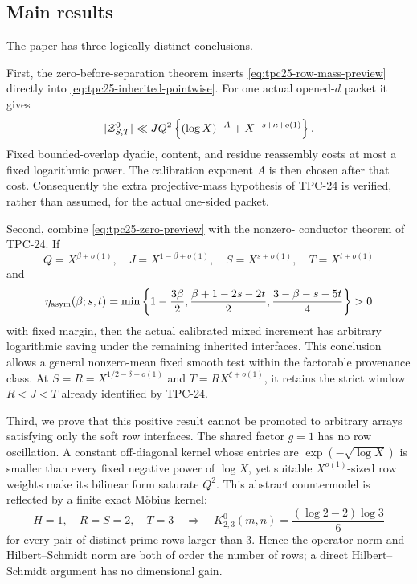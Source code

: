 \subsection{Main results}

The paper has three logically distinct conclusions.

First, the zero-before-separation theorem inserts
\eqref{eq:tpc25-row-mass-preview} directly into
\eqref{eq:tpc25-inherited-pointwise}.  For one actual opened-\(d\)
packet it gives
\begin{equation}
 |\mathcal Z^0_{S,T}|
 \ll JQ^2\left\{(\log X)^{-A}
       +X^{-s+\kappa+o(1)}\right\}.
 \label{eq:tpc25-zero-preview}
\end{equation}
Fixed bounded-overlap dyadic, content, and residue reassembly costs at
most a fixed logarithmic power.  The calibration exponent \(A\) is
then chosen after that cost.  Consequently the extra projective-mass
hypothesis of TPC-24 is verified, rather than assumed, for the actual
one-sided packet.

Second, combine \eqref{eq:tpc25-zero-preview} with the nonzero-
conductor theorem of TPC-24.  If
\[
 Q=X^{\beta+o(1)},\quad J=X^{1-\beta+o(1)},
 \quad S=X^{s+o(1)},\quad T=X^{t+o(1)}
\]
and
\begin{equation}
 \eta_{\rm asym}(\beta;s,t)
 =\min\left\{
 1-\frac{3\beta}{2},
 \frac{\beta+1-2s-2t}{2},
 \frac{3-\beta-s-5t}{4}
 \right\}>0
 \label{eq:tpc25-eta-preview}
\end{equation}
with fixed margin, then the actual calibrated mixed increment has
arbitrary logarithmic saving under the remaining inherited interfaces.
This conclusion allows a general nonzero-mean fixed smooth test within
the factorable provenance class.  At \(S=R=X^{1/2-\delta+o(1)}\) and
\(T=RX^{\xi+o(1)}\), it retains the strict window \(R<J<T\) already
identified by TPC-24.

Third, we prove that this positive result cannot be promoted to
arbitrary arrays satisfying only the soft row interfaces.  The shared
factor \(g=1\) has no row oscillation.  A constant off-diagonal kernel
whose entries are \(\exp(-\sqrt{\log X})\) is smaller than every fixed
negative power of \(\log X\), yet suitable \(X^{o(1)}\)-sized row
weights make its bilinear form saturate \(Q^2\).  This abstract
countermodel is reflected by a finite exact M\"obius kernel:
\[
 H=1,\quad R=S=2,\quad T=3
 \quad\Longrightarrow\quad
 K^0_{2,3}(m,n)=\frac{(\log2-2)\log3}{6}
\]
for every pair of distinct prime rows larger than \(3\).  Hence the
operator norm and Hilbert--Schmidt norm are both of order the number of
rows; a direct Hilbert--Schmidt argument has no dimensional gain.

